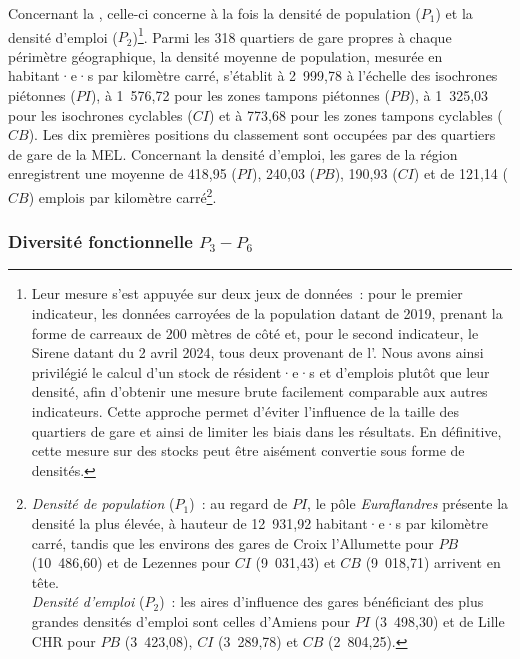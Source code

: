 \begin{refsegment}
Concernant la , celle-ci concerne à la fois la densité de population (\(P_{1}\)) et la densité d'emploi (\(P_{2}\))\footnote{
    Leur mesure s'est appuyée sur deux jeux de données~: pour le premier indicateur, les données carroyées de la population datant de 2019, prenant la forme de carreaux de 200 mètres de côté et, pour le second indicateur, le \acrfull{Sirene} datant du 2 avril 2024, tous deux provenant de l'\textcolor{blue}{\textcite{insee_grille_2021}}. Nous avons ainsi privilégié le calcul d’un stock de résident·e·s et d’emplois plutôt que leur densité, afin d’obtenir une mesure brute facilement comparable aux autres indicateurs. Cette approche permet d’éviter l’influence de la taille des quartiers de gare et ainsi de limiter les biais dans les résultats. En définitive, cette mesure sur des stocks peut être aisément convertie sous forme de densités.
}. Parmi les 318 quartiers de gare propres à chaque périmètre géographique, la densité moyenne de population, mesurée en habitant·e·s par kilomètre carré, s'établit à 2~999,78 à l'échelle des isochrones piétonnes (\(PI\)), à 1~576,72 pour les zones tampons piétonnes (\(PB\)), à 1~325,03 pour les isochrones cyclables (\(CI\)) et à 773,68 pour les zones tampons cyclables (\(CB\)). Les dix premières positions du classement sont occupées par des quartiers de gare de la \acrshort{MEL}. Concernant la densité d'emploi, les gares de la région enregistrent une moyenne de 418,95 (\(PI\)), 240,03 (\(PB\)), 190,93 (\(CI\)) et de 121,14 (\(CB\)) emplois par kilomètre carré\footnote{
    \textsl{Densité de population} (\(P_{1}\))~: au regard de \(PI\), le pôle \textsl{Euraflandres} présente la densité la plus élevée, à hauteur de 12~931,92 habitant·e·s par kilomètre carré, tandis que les environs des gares de Croix l'Allumette pour \(PB\) (10~486,60) et de Lezennes pour \(CI\) (9~031,43) et \(CB\) (9~018,71) arrivent en tête.
    \\
    \textsl{Densité d'emploi} (\(P_{2}\))~: les aires d'influence des gares bénéficiant des plus grandes densités d'emploi sont celles d'Amiens pour \(PI\) (3~498,30) et de Lille CHR pour \(PB\) (3~423,08), \(CI\) (3~289,78) et \(CB\) (2~804,25).
}.%

\subsubsection*{Diversité fonctionnelle \(P_{3} - P_{6}\)
    \label{chap6:indicateurs-place-diversite}
    }
    

\end{refsegment}
